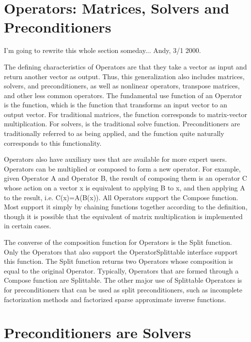 
\section{Operators: Matrices, Solvers and Preconditioners}

I'm going to rewrite this whole section someday... Andy, 3/1 2000.

The defining characteristics of Operators are that they take a vector as input
and return another vector as 
output. Thus, this generalization also includes matrices, solvers, and preconditioners,
as well as nonlinear
operators, transpose matrices, 
and other less common operators. 
The fundamental use function of an Operator is the  function, which
is the function that transforms an input vector to an output vector. 
For traditional matrices, the  function corresponds to
matrix-vector multiplication. For 
solvers,  is the traditional solve function. 
Preconditioners are traditionally
referred to as being applied, 
and the  function quite naturally corresponds to this functionality. 

Operators also have auxiliary uses that are available for more
expert users.
Operators can be multiplied or composed to form a new operator.
For example, given Operator A and Operator B, the result of composing
them is an operator C whose action on a vector x is equivalent to
applying B to x, and then applying A to the result, i.e. C(x)=A(B(x)).
All Operators support the Compose function. 
Most support it simply by chaining  functions together according
to the definition, though it is possible that the equivalent of matrix 
multiplication is implemented in certain cases.

The converse of the composition function for Operators is the Split function.
Only the Operators that also support the OperatorSplittable interface support
this function.
The Split function returns two Operators whose composition is equal to 
the original Operator.
Typically, Operators that are formed through a Compose function are Splittable.
The other major use of Splittable Operators is for preconditioners that can be 
used as split preconditioners, such as incomplete factorization methods and
factorized sparse approximate inverse functions.

\section{Preconditioners are Solvers}

